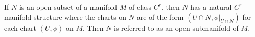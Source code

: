 If $N$ is an open subset of a manifold $M$ of class $C^r$, then $N$ has a natural $C^r$-manifold structure where the charts on $N$ are of the form $(U \cap N, \phi|_{U \cap N})$ for each chart $(U, \phi)$ on $M$. Then $N$ is referred to as an open submanifold of $M$.
